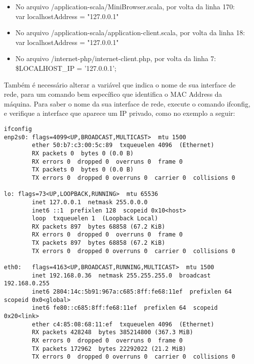 \documentclass[11pt]{article}
\begin{document}
        \begin{itemize}
            \item No arquivo /application-scala/MiniBrowser.scala, por volta da linha 170: \\ 
                    var localhostAddress = "127.0.0.1"
            \item No arquivo /application-scala/application-client.scala, por volta da linha 18: \\
                    var localhostAddress = "127.0.0.1"
            \item No arquivo /internet-php/internet-client.php, por volta da linha 7: \\
                    \$LOCALHOST\_IP = '127.0.0.1';
        \end{itemize}
        
        Também é necessário alterar a variável que indica o nome de sua interface de rede, para um comando bem específico que identifica o MAC Address da máquina. Para saber o nome da sua interface de rede, execute o comando ifconfig, e verifique a interface que aparece um IP privado, como no exemplo a seguir:
        
\begin{lstlisting}
ifconfig
enp2s0: flags=4099<UP,BROADCAST,MULTICAST>  mtu 1500
        ether 50:b7:c3:00:5c:89  txqueuelen 4096  (Ethernet)
        RX packets 0  bytes 0 (0.0 B)
        RX errors 0  dropped 0  overruns 0  frame 0
        TX packets 0  bytes 0 (0.0 B)
        TX errors 0  dropped 0 overruns 0  carrier 0  collisions 0

lo: flags=73<UP,LOOPBACK,RUNNING>  mtu 65536
        inet 127.0.0.1  netmask 255.0.0.0
        inet6 ::1  prefixlen 128  scopeid 0x10<host>
        loop  txqueuelen 1  (Loopback Local)
        RX packets 897  bytes 68858 (67.2 KiB)
        RX errors 0  dropped 0  overruns 0  frame 0
        TX packets 897  bytes 68858 (67.2 KiB)
        TX errors 0  dropped 0 overruns 0  carrier 0  collisions 0

eth0:   flags=4163<UP,BROADCAST,RUNNING,MULTICAST>  mtu 1500
        inet 192.168.0.36  netmask 255.255.255.0  broadcast 192.168.0.255
        inet6 2804:14c:5b91:967a:c685:8ff:fe68:11ef  prefixlen 64  scopeid 0x0<global>
        inet6 fe80::c685:8ff:fe68:11ef  prefixlen 64  scopeid 0x20<link>
        ether c4:85:08:68:11:ef  txqueuelen 4096  (Ethernet)
        RX packets 428248  bytes 385214800 (367.3 MiB)
        RX errors 0  dropped 0  overruns 0  frame 0
        TX packets 172962  bytes 22292022 (21.2 MiB)
        TX errors 0  dropped 0 overruns 0  carrier 0  collisions 0
\end{lstlisting} 
        
\end{document}

